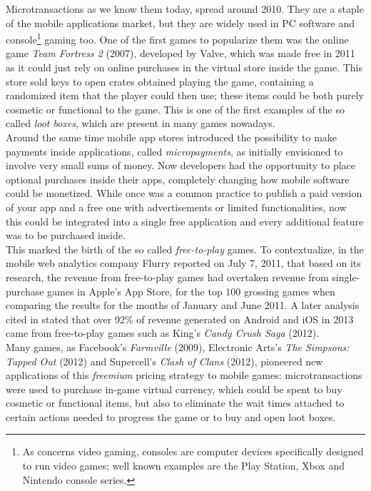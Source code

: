 \documentclass[10pt,a4paper]{article}
\begin{document}
Microtransactions as we know them today, spread around 2010. They are a staple of the mobile applications market, but they are widely used in PC software and console\footnote{As concerns video gaming, consoles are computer devices specifically designed to run video games; well known examples are the Play Station, Xbox and Nintendo console series.} gaming too.
One of the first games to popularize them was the online game \textit{Team Fortress 2} (2007), developed by Valve, which was made free in 2011 as it could just rely on online purchases in the virtual store inside the game. 
This store sold keys to open crates obtained playing the game, containing a randomized item that the player could then use; these items could be both purely cosmetic or functional to the game. 
This is one of the first examples of the so called \textit{loot boxes}, which are present in many games nowadays.\\ 
Around the same time mobile app stores introduced the possibility to make payments inside applications, called \textit{micropayments}, as initially envisioned to involve very small sums of money.
Now developers had the opportunity to place optional purchases inside their apps, completely changing how mobile software could be monetized.
While once was a common practice to publish a paid version of your app and a free one with advertisements or limited functionalities, now this could be integrated into a single free application and every additional feature was to be purchased inside.\\
This marked the birth of the so called \textit{free-to-play} games.
To contextualize, in \parencite{flurry} the mobile web analytics company Flurry reported on July 7, 2011, that based on its research, the revenue from free-to-play games had overtaken revenue from single-purchase games in Apple's App Store, for the top 100 grossing games when comparing the results for the months of January and June 2011.
A later analysis cited in \parencite{recode} stated that over 92\% of revenue generated on Android and iOS in 2013 came from free-to-play games such as King's \textit{Candy Crush Saga} (2012).\\
Many games, as Facebook's \textit{Farmville} (2009), Electronic Arts's \textit{The Simpsons: Tapped Out} (2012) and Supercell's \textit{Clash of Clans} (2012), pioneered new applications of this \textit{freemium} pricing strategy to mobile games: microtransactions were used to purchase in-game virtual currency, which could be spent to buy cosmetic or functional items, but also to eliminate the wait times attached to certain actions needed to progress the game or to buy and open loot boxes.
\end{document}
